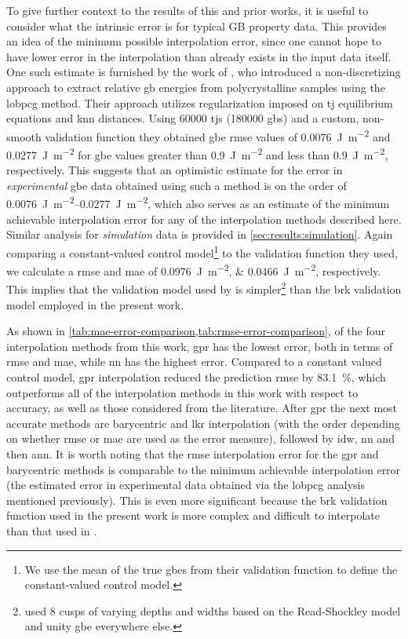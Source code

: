 \documentclass[final,twocolumn,12pt]{elsarticle}
\newcommand{\gprrmsePercReduction}{83.1}
\begin{document}
{To give further context to the results of this and prior works, it is useful to consider what the intrinsic error is for typical GB property data. This provides an idea of the minimum possible interpolation error, since one cannot hope to have lower error in the interpolation than already exists in the input data itself. One such estimate is furnished by the work of \citet{shenDeterminingGrainBoundary2019}, who introduced a non-discretizing approach to extract relative \gls{gb} energies from polycrystalline samples using the \gls{lobpcg} method. Their approach utilizes regularization imposed on \gls{tj} equilibrium equations and \gls{knn} distances. Using \num{60000} \glspl{tj} (\num{180000} \glspl{gb}) and a custom, non-smooth validation function they obtained \gls{gbe} \gls{rmse} values of \SI{0.0076}{\J\per\square\meter} and \SI{0.0277}{\J\per\square\meter} for \gls{gbe} values greater than \SI{0.9}{\J\per\square\meter} and less than \SI{0.9}{\J\per\square\meter}, respectively. This suggests that an optimistic estimate for the error in \emph{experimental} \gls{gbe} data obtained using such a method is on the order of \SIrange{0.0076}{0.0277}{\J\per\square\meter}, which also serves as an estimate of the minimum achievable interpolation error for any of the interpolation methods described here. Similar analysis for \emph{simulation} data is provided in \cref{sec:results:simulation}. Again comparing a constant-valued control model\footnote{We use the mean of the true \glspl{gbe} from their validation function to define the constant-valued control model.} to the validation function they used, we calculate a \gls{rmse} and \gls{mae} of \SIlist{0.0976;0.0466}{\joule\per\square\meter}, respectively. This implies that the validation model used by \citet{shenDeterminingGrainBoundary2019} is simpler\footnote{\citet{shenDeterminingGrainBoundary2019} used 8 cusps of varying depths and widths based on the Read-Shockley model and unity \gls{gbe} everywhere else.} than the \gls{brk} validation model employed in the present work.

As shown in \cref{tab:mae-error-comparison,tab:rmse-error-comparison}, of the four interpolation methods from this work, \Gls{gpr} has the lowest error, both in terms of \gls{rmse} and \gls{mae}, while \gls{nn} has the highest error. Compared to a constant valued control model, \gls{gpr} interpolation reduced the prediction \gls{rmse} by \SI{\gprrmsePercReduction}{\percent}, which outperforms all of the interpolation methods in this work with respect to accuracy, as well as those considered from the literature. After \gls{gpr} the next most accurate methods are barycentric and \gls{lkr} interpolation (with the order depending on whether \gls{rmse} or \gls{mae} are used as the error measure), followed by \gls{idw}, \gls{nn} and then \gls{ann}. It is worth noting that the \gls{rmse} interpolation error for the \gls{gpr} and barycentric methods is comparable to the minimum achievable interpolation error (the estimated error in experimental data obtained via the \gls{lobpcg} analysis mentioned previously). This is even more significant because the \gls{brk} validation function used in the present work is more complex and difficult to interpolate than that used in \cite{shenDeterminingGrainBoundary2019}.

}
\end{document}
